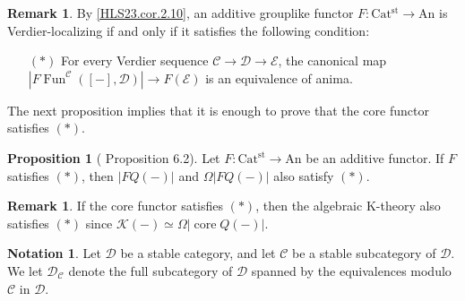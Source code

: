 \documentclass[a4paper,dvipdfmx,11pt,reqno]{amsart}
\DeclareMathOperator{\Fun}{Fun}
\newcommand{\C}{\mathcal{C}}
\newcommand{\D}{\mathcal{D}}
\newcommand{\E}{\mathcal{E}}
\newcommand{\I}{\mathcal{I}}
\newcommand{\K}{\mathcal{K}}
\DeclareMathOperator{\core}{core}
\DeclareMathOperator{\asscat}{asscat}
\DeclareMathOperator{\Span}{Span}
\newcommand{\An}{\mathrm{An}}
\newcommand{\Catst}{\mathrm{Cat^{st}}}
\theoremstyle{definition}
\newtheorem{lemma}[theorem]{Lemma}
\newtheorem{notation}[theorem]{Notation}
\newtheorem{proposition}[theorem]{Proposition}
\newtheorem{remark}[theorem]{Remark}
\begin{document}
\begin{remark}
  By \cref{HLS23.cor.2.10}, an additive grouplike functor $F : \Catst \to \An$ is Verdier-localizing if and only if it satisfies the following condition:
  \begin{itemize}
    \item[$(\ast)$] For every Verdier sequence $\C \to \D \to \E$, the canonical map $|F\Fun^{\C}([-],\D)| \to F(\E)$ is an equivalence of anima.
  \end{itemize}
\end{remark}

The next proposition implies that it is enough to prove that the core functor satisfies $(\ast)$.

\begin{proposition}[\cite{HLS23} Proposition 6.2] \label{HLS23.prop.6.2} 
  Let $F : \Catst \to \An$ be an additive functor.
  If $F$ satisfies $(\ast)$, then $|FQ(-)|$ and $\Omega|FQ(-)|$ also satisfy $(\ast)$.
\end{proposition}

\begin{remark}
  If the core functor satisfies $(\ast)$, then the algebraic K-theory also satisfies $(\ast)$ since $\K(-) \simeq \Omega|\core Q(-)|$.
\end{remark}




\begin{notation}
  Let $\D$ be a stable category, and let $\C$ be a stable subcategory of $\D$.
  We let $\D_{\C}$ denote the full subcategory of $\D$ spanned by the equivalences modulo $\C$ in $\D$.
\end{notation}
\end{document}
